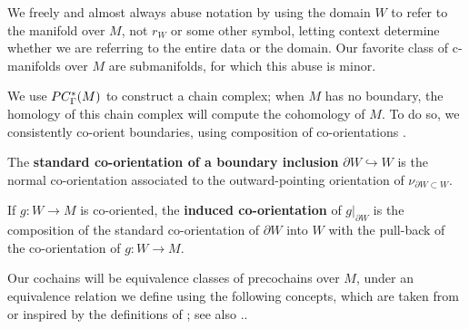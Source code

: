 \begin{comment}
	Let $\cman_\Gamma^*(M)$ be the free abelian group generated by $\cman_\Gamma(M)$, graded by the \textbf{codimension} $|W|$, modulo the following relations:
	\begin{enumerate}
		\item ${V \sqcup W} = V + W$,
		\item ${{W}^{op}} = -W$, where ${W}^{op}$ denotes the co-oriented manifold over $M$ obtained by reversing the co-orientation.
	\end{enumerate}



We take a free abelian group and then quotient by the first relation instead of defining sum as disjoint union as in \cite{Lipy14} since we define our manifolds with corners as subspaces of a fixed universe, which complicates self addition through union.
By these relations any element of $\cman_\Gamma^*(M)$ is represented by a single map from a likely disconnected manifold with corners, as in particular one can find as many ``copies'' as one needs of any manifold with corners embedded in $\R^\infty$.
\end{comment}


We freely and almost always abuse notation by using the domain $W$ to refer to the manifold over $M$, not $r_W$ or some other symbol, letting context determine whether we are referring to the entire data or the domain.
Our favorite class of c-manifolds over $M$ are submanifolds, for which this abuse is minor.

We use $PC_\Gamma^*(M)$ to construct a chain complex; when $M$ has no boundary, the homology of this chain complex will compute the cohomology of $M$.
To do so, we consistently co-orient boundaries, using composition of co-orientations \cite[Section 3.3.2]{medina2022foundations}.

\begin{definition}\label{D:boundary co-orientation}
	The {\bf standard co-orientation of a boundary inclusion} $\partial W \hookrightarrow W$ is the normal co-orientation associated to the outward-pointing orientation of $\nu_{\partial W \subset W}$.

	If $g \colon W \to M$ is co-oriented, the {\bf induced co-orientation} of $g|_{\partial W}$ is the composition of the standard co-orientation of $\partial W$ into $W$ with the pull-back of the co-orientation of $g \colon W \to M$.
\end{definition}

Our cochains will be equivalence classes of precochains over $M$, under an equivalence relation we define using the following concepts, which are taken from or inspired by the definitions of \cite{Lipy14}; see also \cite[Section 4.1]{medina2022foundations}..

